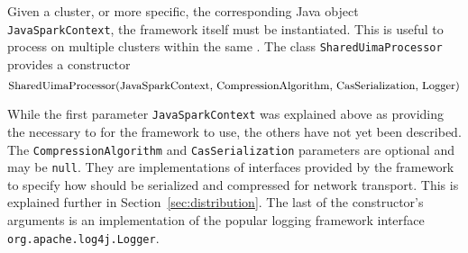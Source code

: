 Given a \spark{} cluster, or more specific, the corresponding Java object \lstinline|JavaSparkContext|, the framework itself must be instantiated. This is useful to process on multiple \spark{} clusters within the same \jvm{}. The class \lstinline|SharedUimaProcessor| provides a constructor 
\[ 
\text{\lstinline|SharedUimaProcessor(JavaSparkContext, CompressionAlgorithm, CasSerialization, Logger)|}
\]

While the first parameter \lstinline|JavaSparkContext| was explained above as providing the necessary \api{} to \spark{} for the framework to use, the others have not yet been described. The \lstinline|CompressionAlgorithm| and \lstinline|CasSerialization| parameters are optional and may be \lstinline|null|. They are implementations of interfaces provided by the framework to specify how \cas{} should be serialized and compressed for network transport. This is explained further in Section~\ref{sec:distribution}. The last of the constructor's arguments is an implementation of the popular logging framework interface \lstinline|org.apache.log4j.Logger|.

